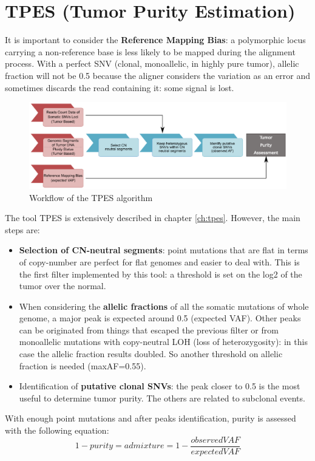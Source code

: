 \section{TPES (Tumor Purity Estimation)}
It is important to consider the \textbf{Reference Mapping Bias}: a polymorphic locus carrying a non-reference base is less likely to be mapped during the alignment process. With a perfect SNV (clonal, monoallelic, in highly pure tumor), allelic fraction will not be 0.5 because the aligner considers the variation as an error and sometimes discards the read containing it: some signal is lost.
\begin{figure}[H]
\centering
    \includegraphics[width=0.7\linewidth]{tpes.png}
    \caption{Workflow of the TPES algorithm}
    \label{fig:tpes}
\end{figure}

The tool TPES is extensively described in chapter \ref{ch:tpes}. However, the main steps are:
\begin{itemize}
    \item \textbf{Selection of CN-neutral segments}: point mutations that are
    flat in terms of copy-number are perfect for flat genomes and easier to deal
    with. This is the first filter implemented by this tool: a threshold is set
    on the log2 of the tumor over the normal.

    \item When considering the \textbf{allelic fractions} of all the somatic
    mutations of whole genome, a major peak is expected around 0.5 (expected
    VAF). Other peaks can be originated from things that escaped the previous
    filter or from monoallelic mutations with copy-neutral LOH (loss of
    heterozygosity): in this case the allelic fraction results doubled. So
    another threshold on allelic fraction is needed (maxAF=0.55).

    \item Identification of \textbf{putative clonal SNVs}: the peak closer to
    0.5 is the most useful to determine tumor purity. The others are related to
    subclonal events.
\end{itemize}

With enough point mutations and after peaks identification, purity is assessed
with the following equation:
\[ 1-purity = admixture = 1-\frac{observedVAF}{expectedVAF} \]

